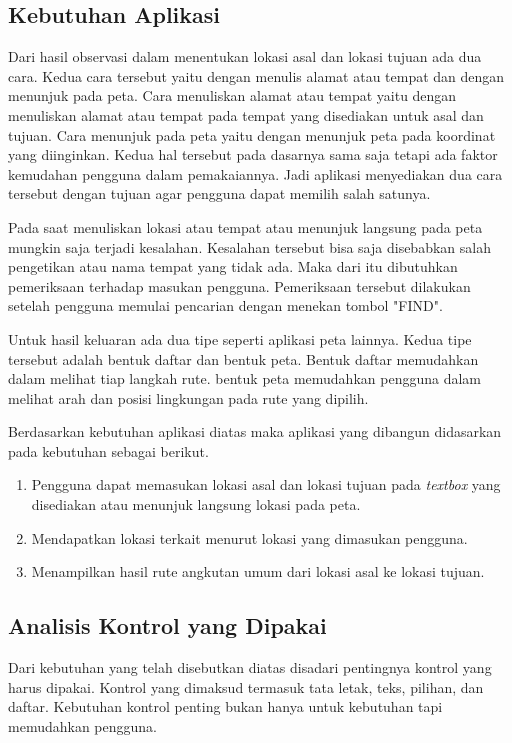 \subsection{Kebutuhan Aplikasi}
\label{lab:Kebutuhan Aplikasi}
\hspace{0.5cm} Dari hasil observasi dalam menentukan lokasi asal dan lokasi tujuan ada dua cara. Kedua cara tersebut yaitu dengan menulis alamat atau tempat dan dengan menunjuk pada peta. Cara menuliskan alamat atau tempat yaitu dengan menuliskan alamat atau tempat pada tempat yang disediakan untuk asal dan tujuan. Cara menunjuk pada peta yaitu dengan menunjuk peta pada koordinat yang diinginkan. Kedua hal tersebut pada dasarnya sama saja tetapi ada faktor kemudahan pengguna dalam pemakaiannya. Jadi aplikasi menyediakan dua cara tersebut dengan tujuan agar pengguna dapat memilih salah satunya.

Pada saat menuliskan lokasi atau tempat atau menunjuk langsung pada peta mungkin saja terjadi kesalahan. Kesalahan tersebut bisa saja disebabkan salah pengetikan atau nama tempat yang tidak ada. Maka dari itu dibutuhkan pemeriksaan terhadap masukan pengguna. Pemeriksaan tersebut dilakukan setelah pengguna memulai pencarian dengan menekan tombol "FIND".

Untuk hasil keluaran ada dua tipe seperti aplikasi peta lainnya. Kedua tipe tersebut adalah bentuk daftar dan bentuk peta. Bentuk daftar memudahkan dalam melihat tiap langkah rute. bentuk peta memudahkan pengguna dalam melihat arah dan posisi lingkungan pada rute yang dipilih.

\hspace{0.5cm} Berdasarkan kebutuhan aplikasi diatas maka aplikasi yang dibangun didasarkan pada kebutuhan sebagai berikut.
\begin{enumerate}
	\item Pengguna dapat memasukan lokasi asal dan lokasi tujuan pada \textit{textbox} yang disediakan atau menunjuk langsung lokasi pada peta.
	\item Mendapatkan lokasi terkait menurut lokasi yang dimasukan pengguna.
	\item Menampilkan hasil rute angkutan umum dari lokasi asal ke lokasi tujuan.
\end{enumerate}

\subsection{Analisis Kontrol yang Dipakai}
\label{lab:Analisis Kontrol yang Dipakai}
\hspace{0.5cm} Dari kebutuhan yang telah disebutkan diatas disadari pentingnya kontrol yang harus dipakai. Kontrol yang dimaksud termasuk tata letak, teks, pilihan, dan daftar. Kebutuhan kontrol penting bukan hanya untuk kebutuhan tapi memudahkan pengguna.

